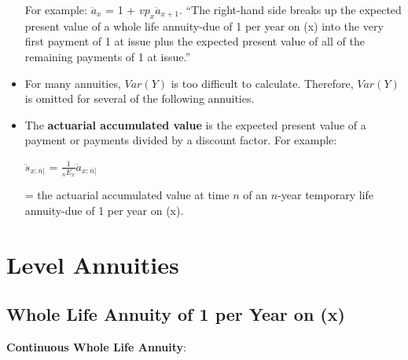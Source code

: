 \documentclass[]{book}
\begin{document}
\begin{itemize}
  For example: \(\ddot{a}_x\) = 1 + \(vp_x\ddot{a}_{x + 1}\). ``The
  right-hand side breaks up the expected present value of a whole life
  annuity-due of 1 per year on (x) into the very first payment of 1 at
  issue plus the expected present value of all of the remaining payments
  of 1 at issue.''
\item
  For many annuities, \(Var(Y)\) is too difficult to calculate.
  Therefore, \(Var(Y)\) is omitted for several of the following
  annuities.
\item
  The \textbf{actuarial accumulated value} is the expected present value
  of a payment or payments divided by a discount factor. For example:

  \(\ddot{s}_{x :\overline{n}|}\) =
  \(\frac{1}{{}_{n}E_x}\)\(\ddot{a}_{x:\overline{n}|}\)

  = the actuarial accumulated value at time \(n\) of an \(n\)-year
  temporary life annuity-due of 1 per year on (x).
\end{itemize}

\section{Level Annuities}\label{level-annuities}

\subsection{Whole Life Annuity of 1 per Year on
(x)}\label{whole-life-annuity-of-1-per-year-on-x}

\textbf{Continuous Whole Life Annuity}:
\end{document}
